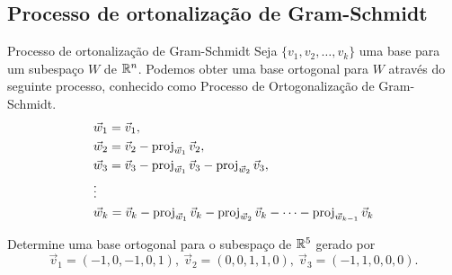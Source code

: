 \subsection*{Processo de ortonalização de Gram-Schmidt}
%
%


\begin{frame}[label=orto]{Processo de ortonalização de Gram-Schmidt}
Seja $\{v_1,v_2,\ldots, v_k \}$ uma base para um subespaço $W$ de $\mathbb{R}^n$. 
Podemos obter uma base ortogonal para $W$ através do seguinte processo, conhecido como {\color{blue}Processo de Ortogonalização de Gram-Schmidt}.
\begin{align*}
& \vec{w}_1=\vec{v}_1,\\
& \vec{w}_2=\vec{v}_2-\operatorname{proj}_{{\vec{w}_1}}\vec{v}_2,\\
& \vec{w}_3=\vec{v}_3-\operatorname{proj}_{{\vec{w}_1}}\vec{v}_3
-\operatorname{proj}_{{\vec{w}_2}}\vec{v}_3,\\
& \vdots\\
& \vec{w}_k=\vec{v}_k-\operatorname{proj}_{{\vec{w}_1}}\vec{v}_k
-\operatorname{proj}_{{\vec{w}_2}}\vec{v}_k-\cdots-\operatorname{proj}_{{\vec{w}_{k-1}}}\vec{v}_k
\end{align*}


\begin{exe}
Determine uma base ortogonal para o subespaço de $\mathbb{R}^5$ gerado por
\[\vec{v}_1=(-1,0,-1,0,1),\ \vec{v}_2=(0,0,1,1,0),\ \vec{v}_3=(-1,1,0,0,0).\]
\end{exe}

\end{frame}




